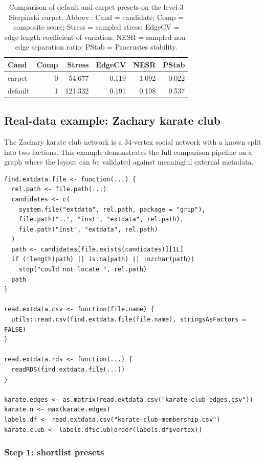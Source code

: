 \begin{table}

\caption{\label{tab:unnamed-chunk-5}Comparison of default and carpet presets on the level-3 Sierpinski carpet. Abbrev.: Cand = candidate; Comp = composite score; Stress = sampled stress; EdgeCV = edge-length coefficient of variation; NESR = sampled non-edge separation ratio; PStab = Procrustes stability.}
\centering
\begin{tabular}[t]{l|r|r|r|r|r}
\hline
Cand & Comp & Stress & EdgeCV & NESR & PStab\\
\hline
carpet & 0 & 54.677 & 0.119 & 1.092 & 0.022\\
\hline
default & 1 & 121.332 & 0.191 & 0.108 & 0.537\\
\hline
\end{tabular}
\end{table}

\subsection{Real-data example: Zachary karate club}\label{sec:karate}

The Zachary karate club network \citep{zachary1977} is a 34-vertex social network
with a known split into two factions. This example demonstrates the full
comparison pipeline on a graph where the layout can be validated against
meaningful external metadata.

\begin{verbatim}
find.extdata.file <- function(...) {
  rel.path <- file.path(...)
  candidates <- c(
    system.file("extdata", rel.path, package = "grip"),
    file.path("..", "inst", "extdata", rel.path),
    file.path("inst", "extdata", rel.path)
  )
  path <- candidates[file.exists(candidates)][1L]
  if (!length(path) || is.na(path) || !nzchar(path))
    stop("could not locate ", rel.path)
  path
}

read.extdata.csv <- function(file.name) {
  utils::read.csv(find.extdata.file(file.name), stringsAsFactors = FALSE)
}

read.extdata.rds <- function(...) {
  readRDS(find.extdata.file(...))
}

karate.edges <- as.matrix(read.extdata.csv("karate-club-edges.csv"))
karate.n <- max(karate.edges)
labels.df <- read.extdata.csv("karate-club-membership.csv")
karate.club <- labels.df$club[order(labels.df$vertex)]
\end{verbatim}

\subsubsection{Step 1: shortlist presets}\label{step-1-shortlist-presets}

